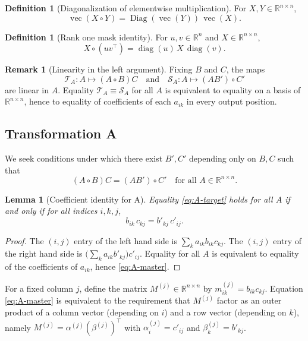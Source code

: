 \documentclass[11pt,a4paper]{article}
\newtheorem{lemma}[theorem]{Lemma}
\theoremstyle{definition}
\newtheorem{definition}[theorem]{Definition}
\newtheorem{remark}[theorem]{Remark}
\newcommand{\R}{\mathbb{R}}
\newcommand{\Had}{\circ}
\newcommand{\diag}{\operatorname{diag}}
\newcommand{\Diag}{\operatorname{Diag}}
\newcommand{\vecop}{\operatorname{vec}}
\begin{document}
\begin{definition}[Diagonalization of elementwise multiplication]
For $X,Y\in\R^{n\times n}$,
\[
\vecop(X\Had Y)=\Diag(\vecop(Y))\,\vecop(X).
\]
\end{definition}

\begin{definition}[Rank one mask identity]
For $u,v\in\R^n$ and $X\in\R^{n\times n}$,
\[
X\Had (uv^\top)=\diag(u)\,X\,\diag(v).
\]
\end{definition}

\begin{remark}[Linearity in the left argument]
Fixing $B$ and $C$, the maps
\[
\mathcal{T}_A: A\mapsto (A\Had B)C
\quad\text{and}\quad
\mathcal{S}_A: A\mapsto (AB')\Had C'
\]
are linear in $A$. Equality $\mathcal{T}_A\equiv\mathcal{S}_A$ for all $A$ is equivalent to equality on a basis of $\R^{n\times n}$, hence to equality of coefficients of each $a_{ik}$ in every output position.
\end{remark}

\subsection{Transformation A}
We seek conditions under which there exist $B',C'$ depending only on $B,C$ such that
\begin{equation}\label{eq:A-target}
(A\Had B)C = (AB')\Had C' \quad \text{for all } A\in\R^{n\times n}.
\end{equation}

\begin{lemma}[Coefficient identity for A]\label{lem:A-coeff}
Equality \eqref{eq:A-target} holds for all $A$ if and only if for all indices $i,k,j$,
\begin{equation}\label{eq:A-master}
b_{ik}\,c_{k j} = b'_{k j}\,c'_{i j}.
\end{equation}
\end{lemma}

\begin{proof}
The $(i,j)$ entry of the left hand side is $\sum_{k} a_{ik} b_{ik} c_{k j}$. The $(i,j)$ entry of the right hand side is $\big(\sum_k a_{ik} b'_{k j}\big)c'_{i j}$. Equality for all $A$ is equivalent to equality of the coefficients of $a_{ik}$, hence \eqref{eq:A-master}.
\end{proof}

For a fixed column $j$, define the matrix $M^{(j)}\in\R^{n\times n}$ by $m^{(j)}_{ik}=b_{ik}c_{k j}$. Equation \eqref{eq:A-master} is equivalent to the requirement that $M^{(j)}$ factor as an outer product of a column vector (depending on $i$) and a row vector (depending on $k$), namely $M^{(j)}=\alpha^{(j)} (\beta^{(j)})^\top$ with $\alpha^{(j)}_i=c'_{i j}$ and $\beta^{(j)}_k=b'_{k j}$.
\end{document}
